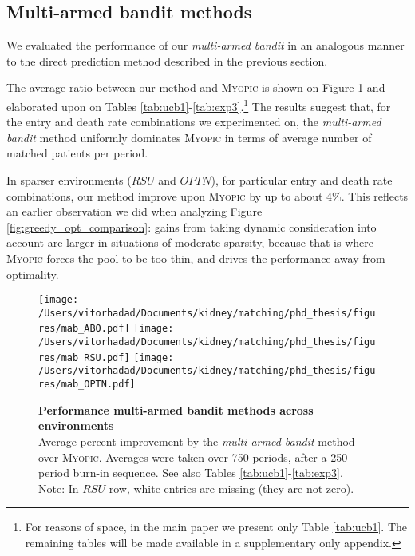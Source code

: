 \subsection{Multi-armed bandit methods}

We evaluated the performance of our \emph{multi-armed bandit} in an analogous manner to the direct prediction method described in the previous section.

The average ratio between our method and \textsc{Myopic} is shown on Figure \ref{fig:mab} and elaborated upon on Tables \ref{tab:ucb1}-\ref{tab:exp3}.\footnote{For reasons of space, in the main paper we present only Table \ref{tab:ucb1}. The remaining tables will be made available in a supplementary only appendix.} The results suggest that, for the entry and death rate combinations we experimented on, the \emph{multi-armed bandit} method uniformly dominates \textsc{Myopic} in terms of average number of matched patients per period.

In sparser environments ($RSU$ and $OPTN$), for particular entry and death rate combinations, our method improve upon \textsc{Myopic} by up to about 4\%. This reflects an earlier observation we did when analyzing Figure \ref{fig:greedy_opt_comparison}: gains from taking dynamic consideration into account are larger in situations of moderate sparsity, because that is where \textsc{Myopic} forces the pool to be too thin, and drives the performance away from optimality.


\begin{figure}
\centering
\hspace*{-1.6cm}
\texttt{[image: /Users/vitorhadad/Documents/kidney/matching/phd\_thesis/figures/mab\_ABO.pdf]}
\hspace*{-1.6cm}
\texttt{[image: /Users/vitorhadad/Documents/kidney/matching/phd\_thesis/figures/mab\_RSU.pdf]}
\hspace*{-1.6cm}
\texttt{[image: /Users/vitorhadad/Documents/kidney/matching/phd\_thesis/figures/mab\_OPTN.pdf]}
\caption[Performance of multi-armed bandit across environments]{\textbf{Performance multi-armed bandit methods across environments} \\
Average percent improvement by the \emph{multi-armed bandit} method over \textsc{Myopic}. Averages were taken over 750 periods, after a 250-period burn-in sequence. See also Tables \ref{tab:ucb1}-\ref{tab:exp3}. \\
{\scriptsize Note: In $RSU$ row, white entries are missing (they are not zero).}}
\label{fig:mab}
\end{figure}


